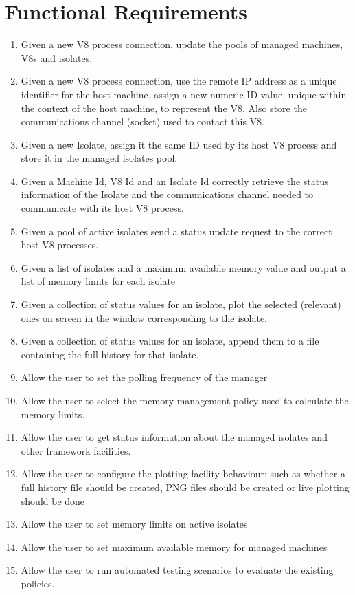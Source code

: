 \documentclass{l4proj}
\begin{document}
\section{Functional Requirements}
\begin{enumerate}
\item Given a new V8 process connection, update the pools of managed machines, V8s and isolates.
\item Given a new V8 process connection, use the remote IP address as a unique identifier for the host machine, assign a new numeric ID value, unique within the context of the host machine, to represent the V8. Also store the communications channel (socket) used to contact this V8.
\item Given a new Isolate, assign it the same ID used by its host V8 process and store it in the managed isolates pool.
\item Given a Machine Id, V8 Id and an Isolate Id correctly retrieve the status information of the Isolate and the communications channel needed to communicate with its host V8 process.
\item Given a pool of active isolates send a status update request to the correct host V8 processes. 
\item Given a list of isolates and a maximum available memory value and output a list of memory limits for each isolate
\item Given a collection of status values for an isolate, plot the selected (relevant) ones on screen in the window corresponding to the isolate.
\item Given a collection of status values for an isolate, append them to a file containing the full history for that isolate.
\item Allow the user to set the polling frequency of the manager
\item Allow the user to select the memory management policy used to calculate the memory limits.
\item Allow the user to get status information about the managed isolates and other framework facilities.
\item Allow the user to configure the plotting facility behaviour: such as whether a full history file should be created, PNG files should be created or live plotting should be done
\item Allow the user to set memory limits on active isolates
\item Allow the user to set maximum available memory for managed machines
\item Allow the user to run automated testing scenarios to evaluate the existing policies.
\end{enumerate}
\end{document}
